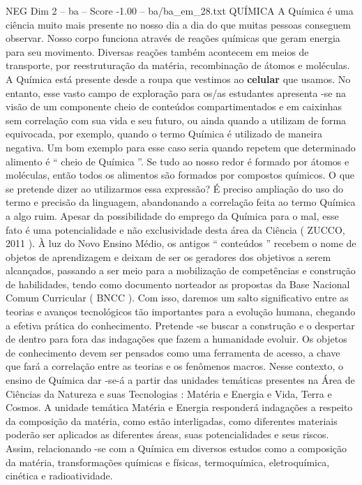 \begin{textsample}{NEG Dim 2 – ba – Score -1.00 – ba/ba\_em\_28.txt}  \label{ex:f2_neg_253}
QUÍMICA A Química é uma ciência muito mais presente no nosso dia a dia do que muitas pessoas conseguem observar.
Nosso corpo funciona através de reações químicas que geram energia para seu movimento.
Diversas reações também acontecem em meios de transporte, por reestruturação da matéria, recombinação de átomos e moléculas.
A Química está presente desde a roupa que vestimos ao \textbf{celular} que usamos.
No entanto, esse vasto campo de exploração para os/as estudantes apresenta -se na visão de um componente cheio de conteúdos compartimentados e em caixinhas sem correlação com sua vida e seu futuro, ou ainda quando a utilizam de forma equivocada, por exemplo, quando o termo Química é utilizado de maneira negativa.
Um bom exemplo para esse caso seria quando repetem que determinado alimento é “ cheio de Química ”.
Se tudo ao nosso redor é formado por átomos e moléculas, então todos os alimentos são formados por compostos químicos.
O que se pretende dizer ao utilizarmos essa expressão?
É preciso ampliação do uso do termo e precisão da linguagem, abandonando a correlação feita ao termo Química a algo ruim.
Apesar da possibilidade do emprego da Química para o mal, esse fato é uma potencialidade e não exclusividade desta área da Ciência ( ZUCCO, 2011 ).
À luz do Novo Ensino Médio, os antigos “ conteúdos ” recebem o nome de objetos de aprendizagem e deixam de ser os geradores dos objetivos a serem alcançados, passando a ser meio para a mobilização de competências e construção de habilidades, tendo como documento norteador as propostas da Base Nacional Comum Curricular ( BNCC ).
Com isso, daremos um salto significativo entre as teorias e avanços tecnológicos tão importantes para a evolução humana, chegando a efetiva prática do conhecimento.
Pretende -se buscar a construção e o despertar de dentro para fora das indagações que fazem a humanidade evoluir.
Os objetos de conhecimento devem ser pensados como uma ferramenta de acesso, a chave que fará a correlação entre as teorias e os fenômenos macros.
Nesse contexto, o ensino de Química dar -se-á a partir das unidades temáticas presentes na Área de Ciências da Natureza e suas Tecnologias : Matéria e Energia e Vida, Terra e Cosmos.
A unidade temática Matéria e Energia responderá indagações a respeito da composição da matéria, como estão interligadas, como diferentes materiais poderão ser aplicados as diferentes áreas, suas potencialidades e seus riscos.
Assim, relacionando -se com a Química em diversos estudos como a composição da matéria, transformações químicas e físicas, termoquímica, eletroquímica, cinética e radioatividade.

\end{textsample}
